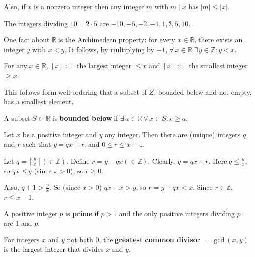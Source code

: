 \documentclass{notes}
\begin{document}
Also, if $x$ is a nonzero integer then any integer $m$ with $m \mid x$ has $\left | m \right | \leq \left | x \right |$.

\begin{eg}
  The integers dividing $10 = 2 \cdot 5$ are $-10, -5, -2, -1, 1, 2, 5, 10$.
\end{eg}

\underline{} One fact about $\mathbb R$ is the Archimedean property: for every $x \in \mathbb R$, there exists an integer $y$ with $x < y$.
It follows, by multiplying by $-1$, $\forall \, x \in \mathbb R \; \exists \, y \in \mathbb Z: y < x$.

\underline{} For any $x \in \mathbb R$, $\left \lfloor x \right \rfloor :=$ the largest integer $\leq x$ and $\left \lceil x \right \rceil :=$ the smallest integer $\geq x$.

This follows form well-ordering that a subset of $Z$, bounded below and not empty, has a smallest element.

\begin{defn}
  A subset $S \subset \mathbb R$ is {\boldmath \bfseries bounded below} if $\exists \, a \in \mathbb R \; \forall \, x \in S: x \geq a$.
\end{defn}

\begin{thm}
  Let $x$ be a positive integer and $y$ any integer.
  Then there are (unique) integers $q$ and $r$ such that $y = q x + r$, and $0 \leq r \leq x - 1$.
\end{thm}

\begin{prf}
  Let $q = \left \lceil \frac{y}{x} \right \rceil (\in \mathbb Z)$.
  Define $r = y - q x (\in \mathbb Z)$.
  Clearly, $y = q x + r$.
  Here $q \leq \frac{y}{x}$, so $q x \leq y$ (since $x > 0$), so $r \geq 0$.

  Also, $q + 1 > \frac{y}{x}$.
  So (since $x > 0$) $q x + x > y$, so $r = y - q x < x$.
  Since $r \in \mathbb Z$, $r \leq x - 1$.
\end{prf}

\begin{defn}
  A positive integer $p$ is {\boldmath \bfseries prime} if $p > 1$ and the only positive integers dividing $p$ are $1$ and $p$.
\end{defn}

\begin{defn}
  For integers $x$ and $y$ not both $0$, the {\boldmath \bfseries greatest common divisor $= \gcd(x, y)$} is the largest integer that divides $x$ and $y$.
\end{defn}
\end{document}
